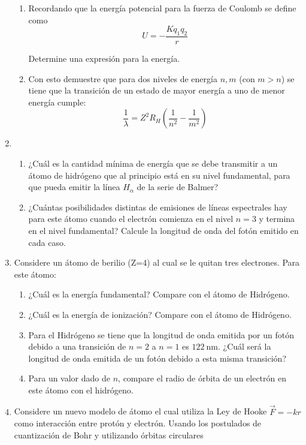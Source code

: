 \documentclass[letterpaper,11pt]{article}
\begin{document}
\begin{enumerate}
\begin{enumerate}
    \item Recordando que la energía potencial para la fuerza de Coulomb se define como
    $$ U = -\frac{Kq_1q_2}{r}$$
    
    Determine una expresión para la energía.
    
    \item Con esto demuestre que para dos niveles de energía $n, m$ (con $m>n$) se tiene que la transición de un estado de mayor energía a uno de menor energía cumple:
    $$\frac{1}{\lambda} = Z^2 R_H\left(\frac{1}{n^2}-\frac{1}{m^2}\right)$$
\end{enumerate}
\item
    \begin{enumerate}
        \item ¿Cuál es la cantidad mínima de energía que se debe transmitir a un átomo de hidrógeno que al principio está en su nivel fundamental, para que pueda emitir la línea $H_{\alpha}$ de la serie de Balmer?
        
        \item ¿Cuántas posibilidades distintas de emisiones de líneas espectrales hay para este átomo cuando el electrón comienza en el nivel $n = 3$ y termina en el nivel fundamental? Calcule la longitud de onda del fotón emitido en cada caso.
    \end{enumerate}

\item Considere un átomo de berilio (Z=4) al cual se le quitan tres electrones. Para este átomo:
\begin{enumerate}
    \item ¿Cuál es la energía fundamental? Compare con el átomo de Hidrógeno.
    \item ¿Cuál es la energía de ionización? Compare con el átomo de Hidrógeno.
    \item Para el Hidrógeno se tiene que la longitud de onda emitida por un fotón debido a una transición de $n=2$ a $n=1$ es $\SI{122}{\nm}$. ¿Cuál será la longitud de onda emitida de un fotón debido a esta misma transición?
    
    \item Para un valor dado de $n$, compare el radio de órbita de un electrón en este átomo con el hidrógeno.
\end{enumerate}

\item Considere un nuevo modelo de átomo el cual utiliza la Ley de Hooke $\vec{F} = -kr$ como interacción entre protón y electrón. Usando los postulados de cuantización de Bohr y utilizando órbitas circulares


\end{enumerate}
\end{document}
